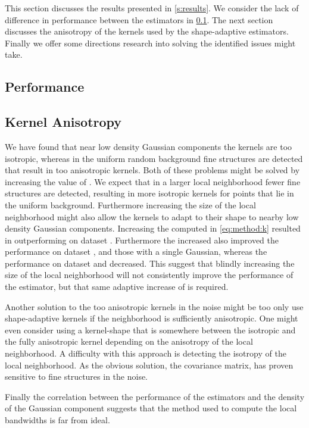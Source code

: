 This section discusses the results presented in \cref{s:results}. We consider the lack of difference in performance between the estimators in \cref{s:discussion:performance}. The next section discusses the anisotropy of the kernels used by the shape-adaptive estimators. Finally we offer some directions research into solving the identified issues might take.

\subsection{Performance}
\label{s:discussion:performance}


\subsection{Kernel Anisotropy}
\label{s:discussion:anisotropy}


We have found that near low density Gaussian components the kernels are too isotropic, whereas in the uniform random background fine structures are detected that result in too anisotropic kernels. Both of these problems might be solved by increasing the value of \KNNK. 
We expect that in a larger local neighborhood fewer fine structures are detected, resulting in more isotropic kernels for points that lie in the uniform background.
Furthermore increasing the size of the local neighborhood might also allow the kernels to adapt to their shape to nearby low density Gaussian components. Increasing the \KNNK computed in \cref{eq:method:k} resulted in \sambe outperforming \mbe on dataset \baakmanFive. Furthermore the increased \KNNK also improved the performance on dataset \ferdosiThree, \baakmanThree and those with a single Gaussian, whereas the performance on dataset \ferdosiTwo and \baakmanTwo decreased. This suggest that blindly increasing the size of the local neighborhood will not consistently improve the performance of the estimator, but that same adaptive increase of \KNNK is required.

Another solution to the too anisotropic kernels in the noise might be too only use shape-adaptive kernels if the neighborhood is sufficiently anisotropic. One might even consider using a kernel-shape that is somewhere between the isotropic and the fully anisotropic kernel depending on the anisotropy of the local neighborhood. A difficulty with this approach is detecting the isotropy of the local neighborhood. As the obvious solution, the covariance matrix, has proven sensitive to fine structures in the noise. 

Finally the correlation between the performance of the estimators and the density of the Gaussian component suggests that the method used to compute the  local bandwidths is far from ideal. 